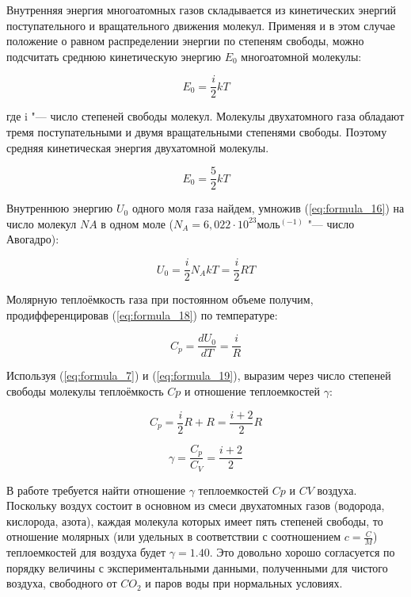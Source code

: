 Внутренняя энергия многоатомных газов складывается из кинетических энергий поступательного и вращательного движения молекул. Применяя и в этом случае положение о равном распределении энергии по степеням свободы, можно подсчитать среднюю кинетическую энергию $E_0$ многоатомной молекулы:

\begin{equation}
    E_0 = \frac{i}{2} k T
    \label{eq:formula_16}
\end{equation}

где i "--- число степеней свободы молекул. Молекулы двухатомного газа обладают тремя поступательными и двумя вращательными степенями свободы. Поэтому средняя кинетическая энергия двухатомной молекулы.

\begin{equation}
    E_0 = \frac{5}{2} k T
    \label{eq:formula_17}
\end{equation}

Внутреннюю энергию $U_0$ одного моля газа найдем, умножив (\ref{eq:formula_16}) на число молекул $NA$ в одном моле ($N_A = 6,022 \cdot 10^23 \text{моль}^(-1)$ "--- число Авогадро):

\begin{equation}
    U_0 = \frac{i}{2} N_A k T = \frac{i}{2} R T
    \label{eq:formula_18}
\end{equation}

Молярную теплоёмкость газа при постоянном объеме получим, продифференцировав (\ref{eq:formula_18}) по температуре:

\begin{equation}
    C_p = \frac{d U_0}{d T} = \frac{i}{R}
    \label{eq:formula_19}
\end{equation}

Используя (\ref{eq:formula_7}) и (\ref{eq:formula_19}), выразим через число степеней свободы молекулы теплоёмкость $Cp$ и отношение теплоемкостей $\gamma$:

\begin{equation*}
    C_p = \frac{i}{2} R + R = \frac{i + 2}{2} R
\end{equation*}

\begin{equation*}
    \gamma = \frac{C_p}{C_V} = \frac{i + 2}{2}
\end{equation*}

В работе требуется найти отношение $\gamma$ теплоемкостей $Cp$ и $CV$ воздуха. Поскольку воздух состоит в основном из смеси двухатомных газов (водорода, кислорода, азота), каждая молекула которых имеет пять степеней свободы, то отношение молярных (или удельных в соответствии с соотношением $c = \frac{C}{M}$) теплоемкостей для воздуха будет $\gamma = 1.40$. Это довольно хорошо согласуется по порядку величины с экспериментальными данными, полученными для чистого воздуха, свободного от $CO_2$ и паров воды при нормальных условиях.

